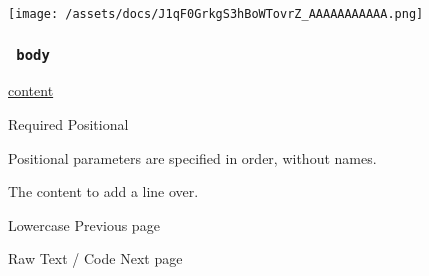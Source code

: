 \texttt{[image: /assets/docs/J1qF0GrkgS3hBoWTovrZ\_AAAAAAAAAAA.png]}

\subsubsection{\texorpdfstring{\texttt{\ body\ }}{ body }}\label{parameters-body}

\href{/docs/reference/foundations/content/}{content}

{Required} {{ Positional }}

\label{parameters-body-positional-tooltip}
Positional parameters are specified in order, without names.

The content to add a line over.

\href{/docs/reference/text/lower/}{\pandocbounded{}}

{ Lowercase } { Previous page }

\href{/docs/reference/text/raw/}{\pandocbounded{}}

{ Raw Text / Code } { Next page }
